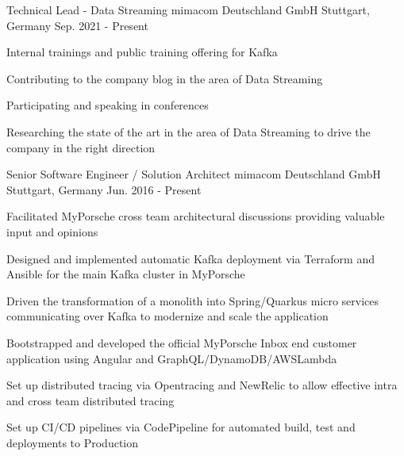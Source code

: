 


\begin{cventries}

  \cventry
    {Technical Lead - Data Streaming} %
    {mimacom Deutschland GmbH} %
    {Stuttgart, Germany} %
    {Sep. 2021 - Present} %
    {
      \begin{cvitems} %
        \item {Internal trainings and public training offering for Kafka}
        \item {Contributing to the company blog in the area of Data Streaming}
        \item {Participating and speaking in conferences}
        \item {Researching the state of the art in the area of Data Streaming to drive the company in the right direction}
      \end{cvitems}
    }

  \cventry
    {Senior Software Engineer / Solution Architect} %
    {mimacom Deutschland GmbH} %
    {Stuttgart, Germany} %
    {Jun. 2016 - Present} %
    {
      \begin{cvitems} %
        \item {Facilitated MyPorsche cross team architectural discussions providing valuable input and opinions}
        \item {Designed and implemented automatic Kafka deployment via Terraform and Ansible for the main Kafka cluster in MyPorsche}
        \item {Driven the transformation of a monolith into Spring/Quarkus micro services communicating over Kafka to modernize and scale the application}
        \item {Bootstrapped and developed the official MyPorsche Inbox end customer application using Angular and GraphQL/DynamoDB/AWSLambda}
        \item {Set up distributed tracing via Opentracing and NewRelic to allow effective intra and cross team distributed tracing}
        \item {Set up CI/CD pipelines via CodePipeline for automated build, test and deployments to Production}
      \end{cvitems}
    }


\end{cventries}
